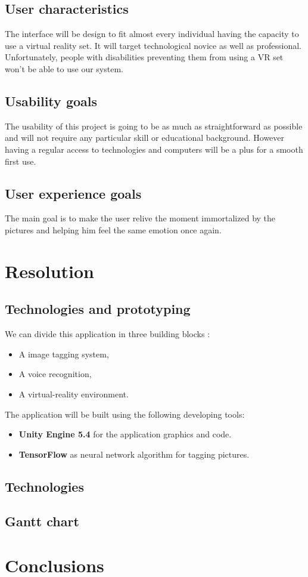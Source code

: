 \documentclass[11pt,a4paper]{article}
\begin{document}
\subsection{User characteristics}

The interface will be design to fit almost every individual having the capacity to use  a virtual reality set. It will target technological novice as well as professional. Unfortunately, people with disabilities preventing them from using a VR set won't be able to use our system.

\subsection{Usability goals}

The usability of this project is going to be as much as straightforward as possible and will not require any particular skill or educational background. However having a regular access to technologies and computers will be a plus for a smooth first use. 

\subsection{User experience goals}

The main goal is to make the user relive the moment immortalized by the pictures and helping him feel the same emotion once again.

\section{Resolution}

\subsection{Technologies and prototyping}

We can divide this application in three building blocks :
\begin{itemize}
	\item A image tagging system,
	\item A voice recognition,
	\item A virtual-reality environment.
\end{itemize}


The application will be built using the following developing tools:
\begin{itemize}
\item \textbf{Unity Engine 5.4} for the application graphics and code.
\item \textbf{TensorFlow} as neural network algorithm for tagging pictures.
\end{itemize}

\subsection{Technologies}


\begin{landscape}
\section{Gantt chart}
\end{landscape}
\section{Conclusions}
\end{document}
